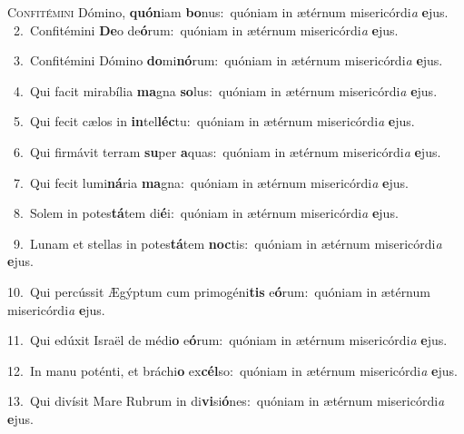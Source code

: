 \lettrine{\initial\textcolor{\initialcolor}{C}}{onfitémini} Dómino, \textbf{quón}\-iam \textbf{bo}\-nus:~\star quóniam in ætérnum misericórdi\textit{a} \textbf{e}\-jus.\\
{\numbfont\textcolor{\numbcolor}{~2.}}~Confitémini \textbf{De}\-o de\-\textbf{ó}\-rum:~\star quóniam in ætérnum misericórdi\textit{a} \textbf{e}\-jus.\par
{\numbfont\textcolor{\numbcolor}{~3.}}~Confitémini Dómino \textbf{do}\-mi\-\textbf{nó}\-rum:~\star quóniam in ætérnum misericórdi\textit{a} \textbf{e}\-jus.\par
{\numbfont\textcolor{\numbcolor}{~4.}}~Qui facit mirabília \textbf{ma}\-gna \textbf{so}\-lus:~\star quóniam in ætérnum misericórdi\textit{a} \textbf{e}\-jus.\par
{\numbfont\textcolor{\numbcolor}{~5.}}~Qui fecit cælos in \textbf{in}\-tel\-\textbf{léc}\-tu:~\star quóniam in ætérnum misericórdi\textit{a} \textbf{e}\-jus.\par
{\numbfont\textcolor{\numbcolor}{~6.}}~Qui firmávit terram \textbf{su}\-per \textbf{a}\-quas:~\star quóniam in ætérnum misericórdi\textit{a} \textbf{e}\-jus.\par
{\numbfont\textcolor{\numbcolor}{~7.}}~Qui fecit lumi\-\textbf{ná}\-ria \textbf{ma}\-gna:~\star quóniam in ætérnum misericórdi\textit{a} \textbf{e}\-jus.\par
{\numbfont\textcolor{\numbcolor}{~8.}}~Solem in potes\-\textbf{tá}\-tem di\-\textbf{é}\-i:~\star quóniam in ætérnum misericórdi\textit{a} \textbf{e}\-jus.\par
{\numbfont\textcolor{\numbcolor}{~9.}}~Lunam et stellas in potes\-\textbf{tá}\-tem \textbf{noc}\-tis:~\star quóniam in ætérnum misericórdi\textit{a} \textbf{e}\-jus.\par
{\numbfont\textcolor{\numbcolor}{10.}}~Qui percússit Ægýptum cum primogéni\textbf{tis} e\-\textbf{ó}\-rum:~\star quóniam in ætérnum misericórdi\textit{a} \textbf{e}\-jus.\par
{\numbfont\textcolor{\numbcolor}{11.}}~Qui edúxit Israël de médi\textbf{o} e\-\textbf{ó}\-rum:~\star quóniam in ætérnum misericórdi\textit{a} \textbf{e}\-jus.\par
{\numbfont\textcolor{\numbcolor}{12.}}~In manu poténti, et bráchi\textbf{o} ex\-\textbf{cél}\-so:~\star quóniam in ætérnum misericórdi\textit{a} \textbf{e}\-jus.\par
{\numbfont\textcolor{\numbcolor}{13.}}~Qui divísit Mare Rubrum in di\-\textbf{vi}\-si\-\textbf{ó}\-nes:~\star quóniam in ætérnum misericórdi\textit{a} \textbf{e}\-jus.\par
